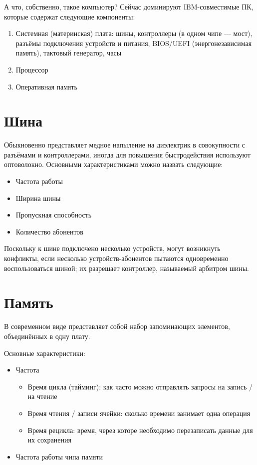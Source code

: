 \documentclass[main]{subfiles}
\begin{document}
А что, собственно, такое компьютер? Сейчас доминируют IBM-совместимые ПК, которые
содержат следующие компоненты:
\begin{enumerate}
\item Системная (материнская) плата: шины, контроллеры (в одном чипе --- мост),
разъёмы подключения устройств и питания, BIOS/UEFI (энергонезависимая память),
тактовый генератор, часы
\item Процессор
\item Оперативная память
\end{enumerate}

\section{Шина}
Обыкновенно представляет медное напыление на диэлектрик в совокупности с
разъёмами и контроллерами, иногда для повышения
быстродействия используют оптоволокно. Основными характеристиками
можно назвать следующие:
\begin{itemize}
\item Частота работы
\item Ширина шины
\item Пропускная способность
\item Количество абонентов
\end{itemize}
Поскольку к шине подключено несколько устройств, могут возникнуть конфликты,
если несколько устройств-абонентов пытаются одновременно воспользоваться шиной;
их разрешает контроллер, называемый арбитром шины.

\section{Память}
В современном виде представляет собой набор запоминающих элементов,
объединённых в одну плату.

Основные характеристики:
\begin{itemize}
\item Частота
\begin{itemize}
\item Время цикла (тайминг): как часто можно отправлять запросы на запись / на чтение
\item Время чтения / записи ячейки: сколько времени занимает одна операция
\item Время рецикла: время, через которе необходимо перезаписать данные для
их сохранения
\end{itemize}
\item Частота работы чипа памяти
\end{itemize}
\end{document}
